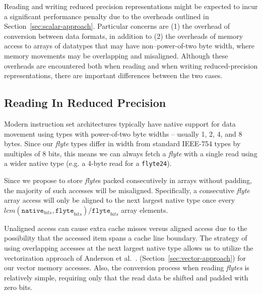 \documentclass{sig-alternate-05-2015}
\newcommand{\mt}[1]{\texttt{#1}}
\begin{document}
Reading and writing reduced precision representations might be expected to
incur a significant performance penalty due to the overheads outlined in
Section~\ref{sec:scalar-approach}. Particular concerns are (1) the overhead of
conversion between data formats, in addition to (2) the overheads of memory
access to arrays of datatypes that may have non--power-of-two byte width, where
memory movements may be overlapping and misaligned. Although these overheads
are encountered both when reading and when writing reduced-precision
representations, there are important differences between the two cases.

\subsection{Reading In Reduced Precision}
\label{sec:reads}

Modern instruction set architectures typically have native support for data
movement using types with power-of-two byte widths -- usually 1, 2, 4, and 8
bytes. Since our \textit{flyte} types differ in width from standard IEEE-754
types by multiples of 8 bits, this means we can always fetch a \textit{flyte}
with a single read using a wider native type (e.g. a 4-byte read for a
\mt{flyte24}).


Since we propose to store \textit{flyte}s packed
consecutively in arrays without padding, the majority of such accesses will be
misaligned. Specifically, a consecutive \textit{flyte} array access will only
be aligned to the next largest native type once every $lcm(
\mathtt{native}_{bits}, \mathtt{flyte}_{bits}) / \mathtt{flyte}_{bits}$ array
elements.

Unaligned access can cause extra cache misses versus aligned access due to the
possibility that the accessed item spans a cache line boundary. The strategy of
using overlapping accesses at the next largest native type allows us to utilize
the vectorization approach of Anderson et al.~\cite{anderson2015automatic}.
(Section~\ref{sec:vector-approach}) for our vector memory accesses. Also, the
conversion process when reading \textit{flytes} is relatively simple, requiring
only that the read data be shifted and padded with zero bits.
\end{document}
